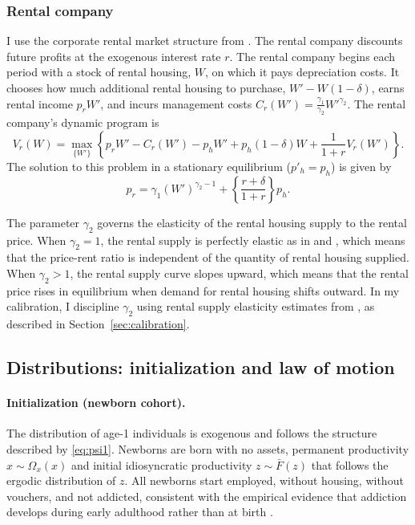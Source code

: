 \documentclass[parskip=full]{article}
\theoremstyle{plain}
\theoremstyle{definition}
\theoremstyle{remark}
\begin{document}
\subsubsection{Rental company}
I use the corporate rental market structure from \citet{garrigaeetal-2009}. The rental company discounts future profits at the exogenous interest rate $r$. The rental company begins each period with a stock of rental housing, $W$, on which it pays depreciation costs. It chooses how much additional rental housing to purchase, $W'-W(1-\delta)$, earns rental income $p_{r} W'$, and incurs management costs $C_r(W') = \frac{\gamma_1}{\gamma_2} W'^{\gamma_2}$. The rental company's dynamic program is
\begin{equation*}
V_r(W)=\max_{\{W'\}} \left\{p_{r}W' - C_r(W') - p_h W' + p_h(1-\delta) W + \frac{1}{1+r}V_r(W')\right\}.
\end{equation*}
The solution to this problem in a stationary equilibrium ($p'_h=p_h$) is given by
\begin{equation}
\label{eq:foc_rental}
p_{r} = \gamma_1 (W')^{\gamma_2-1}+\left\{\frac{r+\delta}{1+r}\right\}p_h.
\end{equation}

The parameter $\gamma_2$ governs the elasticity of the rental housing supply to the rental price. When $\gamma_2=1$, the rental supply is perfectly elastic as in \citet{gervais} and \citet{kaplanetal-2019}, which means that the price-rent ratio is independent of the quantity of rental housing supplied. When $\gamma_{2}>1$, the rental supply curve slopes upward, which means that the rental price rises in equilibrium when demand for rental housing shifts outward. In my calibration, I discipline $\gamma_2$ using rental supply 
elasticity estimates from \citet{rotberg_steinberg_2024_mortgage_interest_deductions}, 
as described in Section~\ref{sec:calibration}.

\subsection{Distributions: initialization and law of motion}\label{sec:dist}

\paragraph{Initialization (newborn cohort).}
The distribution of age-1 individuals is exogenous and follows the structure described by \eqref{eq:psi1}. Newborns are born with no assets, permanent productivity $x\sim \Omega_x(x)$ and initial idiosyncratic productivity $z\sim \bar F(z)$ that follows the ergodic distribution of $z$. All newborns start employed, without housing, without vouchers, and not addicted, consistent with the 
empirical evidence that addiction develops during early adulthood rather than at birth \citep{nsduh_2024}.
\end{document}
